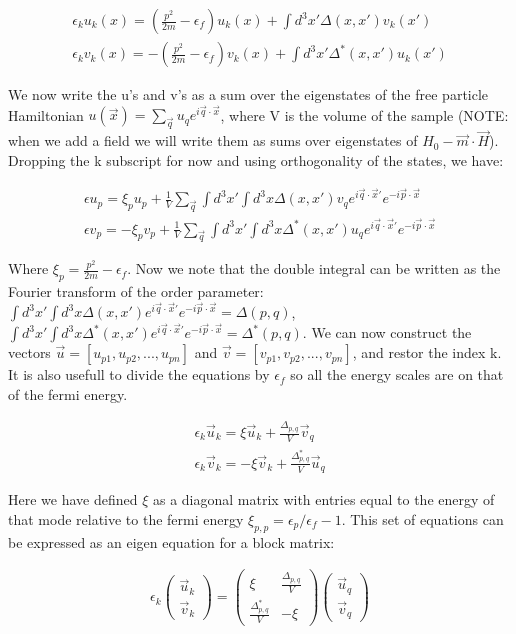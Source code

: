 \documentclass{article}
\begin{document}
\begin{align*}
\epsilon_ku_k(x)=(\frac{p^2}{2m}-\epsilon_f)u_k(x)+\int d^3x'\Delta(x,x')v_k(x') \\
\epsilon_kv_k(x)=-(\frac{p^2}{2m}-\epsilon_f) v_k(x)+\int d^3x'\Delta^*(x,x')u_k(x')
\end{align*}

We now write the u's and v's as a sum over the eigenstates of the free particle Hamiltonian $u(\vec{x})=\sum\limits_{\vec{q}} u_q e^{i\vec{q}\cdot\vec{x}}$, where V is the volume of the sample (NOTE: when we add a field we will write them as sums over eigenstates of $H_0-\vec{m}\cdot\vec{H}$). Dropping the k subscript for now and using orthogonality of the states, we have:

\begin{align*}
\epsilon u_p=\xi_pu_p+\frac{1}{V}\sum\limits_{\vec{q}}\int d^3x'\int d^3x\Delta(x,x')v_q e^{i\vec{q}\cdot\vec{x}'} e^{-i\vec{p}\cdot\vec{x}}\\
\epsilon v_p=-\xi_p v_p+\frac{1}{V}\sum\limits_{\vec{q}}\int d^3x'\int d^3x\Delta^*(x,x')u_q e^{i\vec{q}\cdot\vec{x}'} e^{-i\vec{p}\cdot\vec{x}}
\end{align*}

Where $\xi_p=\frac{p^2}{2m}-\epsilon_f$. Now we note that the double integral can be written as the Fourier transform of the order parameter: $\int d^3x'\int d^3x\Delta(x,x') e^{i\vec{q}\cdot\vec{x}'} e^{-i\vec{p}\cdot\vec{x}}=\Delta(p,q)$, $\int d^3x'\int d^3x\Delta^*(x,x') e^{i\vec{q}\cdot\vec{x}'} e^{-i\vec{p}\cdot\vec{x}}=\Delta^*(p,q)$. We can now construct the vectors $\vec{u}=[u_{p1}, u_{p2}, ... , u_{pn}]$ and $\vec{v}=[v_{p1}, v_{p2}, ... , v_{pn}]$, and restor the index k. It is also usefull to divide the equations by $\epsilon_f$ so all the energy scales are on that of the fermi energy.

\begin{align*}
\epsilon_k \vec{u}_k=\mathcal{\xi}\vec{u}_k+\frac{\Delta_{p,q}}{V}\vec{v}_q\\
\epsilon_k \vec{v}_k=-\mathcal{\xi}\vec{v}_k+\frac{\Delta^*_{p,q}}{V}\vec{u}_q
\end{align*}

Here we have defined $\mathcal{\xi}$ as a diagonal matrix with entries equal to the energy of that mode relative to the fermi energy $\mathcal{\xi}_{p,p}=\epsilon_p/\epsilon_f-1$. This set of equations can be expressed as an eigen equation for a block matrix:

\begin{align*} 
\epsilon_k \left(\begin{array}{c} \vec{u}_k \\ \vec{v}_k \end{array}\right) = \left(\begin{array}{cc} \mathcal{\xi} & \frac{\Delta_{p,q}}{V} \\ \frac{\Delta^*_{p,q}}{V} & -\mathcal{\xi} \end{array}\right)\left(\begin{array}{c} \vec{u}_q \\ \vec{v}_q \end{array}\right)
\end{align*}
\end{document}
